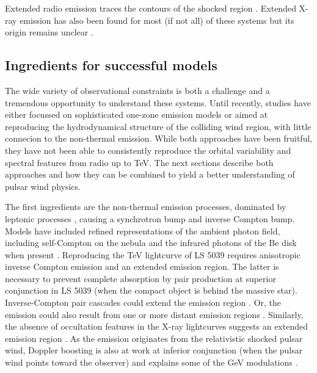 Extended radio emission traces the contours of the shocked region \citep{2006smqw.confE..52D,2011ApJ...732L..10M}. Extended X-ray emission has also been found for most (if not all) of these systems but its origin remains unclear  \citep{2014AN....335..301K}. 




\subsection { Ingredients for successful models}


The wide variety of observational constraints is both a challenge and a tremendous opportunity to understand these systems.  Until recently, studies have either focussed on sophisticated one-zone emission models or aimed at reproducing the hydrodynamical  structure of the colliding wind region, with little connecion to the non-thermal emission. While both approaches have been fruitful, they have not been able to consistently reproduce the  orbital variability and spectral features from radio up to TeV.   The next sections describe both approaches and how they can be combined to yield a better understanding of pulsar wind physics.

The first ingredients are the non-thermal emission processes, dominated by leptonic processes \citep{2006A&A...456..801D}, causing a synchrotron bump and inverse Compton bump.  Models have included refined  representations of the ambient photon field, including self-Compton on the nebula  \citep{2010A&A...519A..81C} and the infrared photons of the Be disk when present  \citep{2012MNRAS.426.3135V}. Reproducing the TeV lightcurve of LS 5039 requires anisotropic inverse Compton emission  \citep{2008A&A...477..691D} and an extended emission region. The latter is necessary to prevent complete absorption by pair production at  superior conjunction in LS 5039 (when the compact object is behind the massive star).  Inverse-Compton pair cascades could extend the emission region \citep{2006MNRAS.371.1737B,2010A&A...519A..81C}. Or, the  emission could also result from one or more  distant emission regions \citep{2013A&A...551A..17Z}.  Similarly, the absence of occultation features in the X-ray lightcurves suggests an extended emission region \citep{2007A&A...473..545B,2011MNRAS.411..193S}.  As the emission originates from the relativistic shocked pulsar wind, Doppler boosting is also at work at inferior conjunction (when the pulsar wind points toward the observer) and explains some of the GeV modulations \citep{2010A&A...516A..18D}. 


